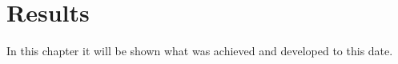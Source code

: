 %
%
\chapter{Results}

In this chapter it will be shown what was achieved and developed to this date.